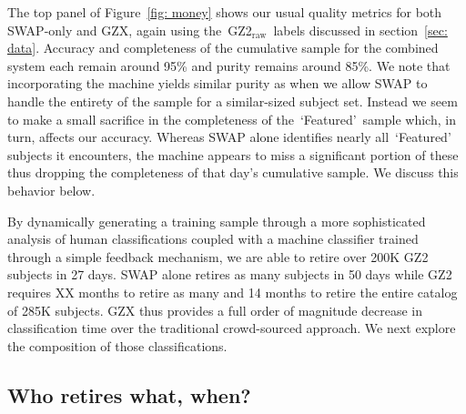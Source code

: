 \documentclass[twocolumn]{aastex6}
\newcommand{\feat}{`Featured'}
\newcommand{\raw}{GZ2$_{\text{raw}}$}
\begin{document}
The top panel of Figure~\ref{fig: money} shows our usual quality metrics for both 
SWAP-only and GZX, again using the~\raw~labels discussed in section~\ref{sec: data}.
Accuracy and completeness of the cumulative sample for the combined system 
each remain around 95\% and purity remains around 85\%. We note that 
incorporating the machine yields similar purity as when we 
allow SWAP to handle the entirety of the sample for a similar-sized subject set. 
Instead we seem to make a small sacrifice in the completeness of the~\feat~sample
which, in turn, affects our accuracy. Whereas SWAP alone identifies nearly all~\feat~
subjects it encounters,  the machine appears to miss a significant 
portion of these thus dropping the completeness of that day's 
cumulative sample. We discuss this behavior below.

By dynamically generating a training sample
through a more sophisticated analysis of human classifications coupled with a 
machine classifier trained through a simple feedback mechanism, we are able to 
retire over 200K GZ2 subjects in 27 days.  SWAP alone retires as many subjects in 50 days
while GZ2 requires XX months to retire as many and 14 months to retire 
the entire catalog of 285K subjects. 
GZX thus provides a full order of magnitude decrease in classification time
over the traditional crowd-sourced approach. 
We next explore the composition of those classifications.




\subsection{Who retires what, when?}  
\end{document}
